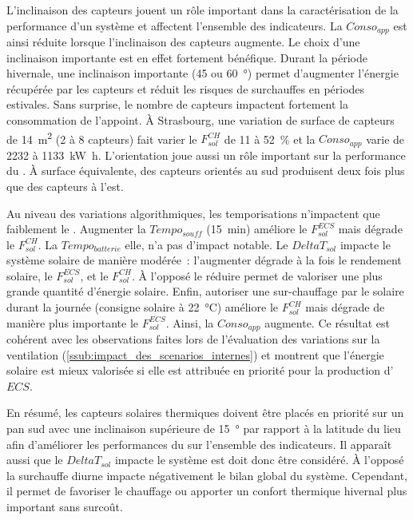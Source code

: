 L’inclinaison des capteurs jouent un rôle important dans la caractérisation de la
performance d’un système  et affectent l’ensemble des indicateurs. La $Conso_{app}$
est ainsi réduite lorsque l’inclinaison des capteurs augmente. Le choix d’une inclinaison
importante est en effet fortement bénéfique. Durant la période hivernale, une inclinaison
importante (\num{45} ou \SI{60}{\degree}) permet d’augmenter l’énergie récupérée par les
capteurs et réduit les risques de surchauffes en périodes estivales. Sans surprise, le
nombre de capteurs impactent fortement la consommation de l’appoint. À Strasbourg, une
variation de surface de capteurs de \SI{14}{\meter\squared} (\num{2} à \num{8} capteurs)
fait varier le $F_{sol}^{CH}$ de \num{11} à \SI{52}{\percent} et la $Conso_{app}$ varie de
\num{2232} à \SI{1133}{\kilo\watt\hour}. L’orientation joue aussi un rôle important sur la
performance du . À surface équivalente, des capteurs orientés au sud produisent deux
fois plus que des capteurs à l’est.

Au niveau des variations algorithmiques, les temporisations n’impactent que faiblement
le . Augmenter la $Tempo_{souff}$ (\SI{15}{min}) améliore le $F_{sol}^{ECS}$ mais dégrade
le $F_{sol}^{CH}$. La $Tempo_{batterie}$ elle, n’a pas d’impact notable. Le $DeltaT_{sol}$
impacte le système solaire de manière modérée~: l’augmenter dégrade à la fois le rendement
solaire, le $F_{sol}^{ECS}$, et le $F_{sol}^{CH}$. À l’opposé le réduire permet de valoriser une plus
grande quantité d’énergie solaire. Enfin, autoriser une sur-chauffage par le solaire
durant la journée (consigne solaire à \SI{22}{\celsius}) améliore le $F_{sol}^{CH}$ mais dégrade
de manière plus importante le $F_{sol}^{ECS}$. Ainsi, la $Conso_{app}$ augmente. Ce résultat est
cohérent avec les observations faites lors de l’évaluation des variations sur la
ventilation (\ref{ssub:impact_des_scenarios_internes}) et montrent que l’énergie solaire
est mieux valorisée si elle est attribuée en priorité pour la production d’$ECS$.

En résumé, les capteurs solaires thermiques doivent être placés en priorité sur un pan sud
avec une inclinaison supérieure de \SI{15}{\degree} par rapport à la latitude du lieu afin
d’améliorer les performances du  sur l’ensemble des indicateurs. Il apparaît aussi
que le $DeltaT_{sol}$ impacte le système est doit donc être considéré. À l’opposé la surchauffe
diurne impacte négativement le bilan global du système. Cependant, il permet de favoriser le
chauffage ou apporter un confort thermique hivernal plus important sans surcoût.





